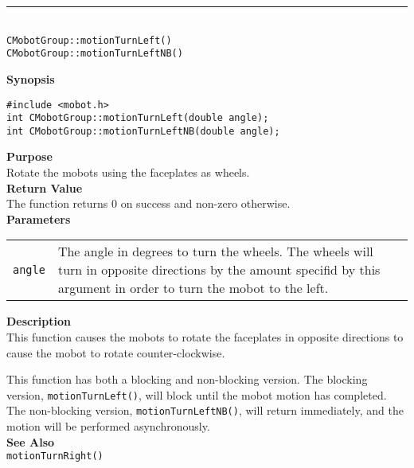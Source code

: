 \noindent
\vspace{5pt}
\rule{4.5in}{0.015in}\\
\noindent
{\LARGE \texttt{CMobotGroup::motionTurnLeft()}}\\
{\LARGE \texttt{CMobotGroup::motionTurnLeftNB()}}\\
{}

\noindent
{\bf Synopsis}
\vspace{-8pt}
\begin{verbatim}
#include <mobot.h>
int CMobotGroup::motionTurnLeft(double angle);
int CMobotGroup::motionTurnLeftNB(double angle);
\end{verbatim}

\noindent
{\bf Purpose}\\
Rotate the mobots using the faceplates as wheels.\\

\noindent
{\bf Return Value}\\
The function returns 0 on success and non-zero otherwise.\\

\noindent
{\bf Parameters}\\
\vspace{-0.1in}
\begin{description}
\item               
\begin{tabular}{p{10 mm}p{145 mm}}
\texttt{angle} & The angle in degrees to turn the wheels. The wheels will turn in opposite directions by the amount specifid by this argument in order to turn the mobot to the left. \\
\end{tabular}
\end{description}

\noindent
{\bf Description}\\
This function causes the mobots to rotate the faceplates in opposite directions
to cause the mobot to rotate counter-clockwise.

This function has both a blocking and non-blocking version.
The blocking version, \texttt{motionTurnLeft()}, will block until the
mobot motion has completed. The non-blocking version, \texttt{motionTurnLeftNB()},
will return immediately, and the motion will be performed asynchronously.\\


\noindent
{\bf See Also}\\
\texttt{motionTurnRight()}

